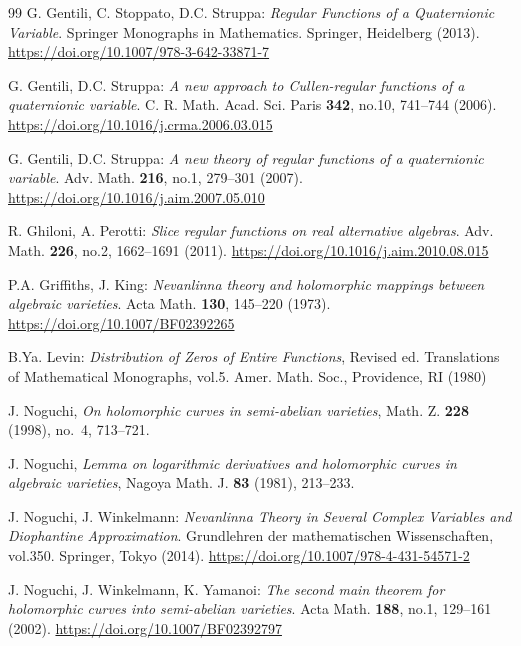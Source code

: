 \documentclass[11pt]{amsart}
\numberwithin{equation}{section}
\theoremstyle{definition}
\theoremstyle{remark}
\begin{document}
\begin{thebibliography}{99}
  G. Gentili, C. Stoppato, D.C. Struppa: \emph{Regular Functions of a Quaternionic Variable}. Springer Monographs in Mathematics. Springer, Heidelberg (2013). \url{https://doi.org/10.1007/978-3-642-33871-7}
  
  G. Gentili, D.C. Struppa: \emph{A new approach to {Cullen}-regular functions of a quaternionic variable}. C. R. Math. Acad. Sci. Paris \textbf{342}, no.10, 741--744 (2006). \url{https://doi.org/10.1016/j.crma.2006.03.015}
  
  G. Gentili, D.C. Struppa: \emph{A new theory of regular functions of a quaternionic variable}. Adv. Math. \textbf{216}, no.1, 279--301 (2007). \url{https://doi.org/10.1016/j.aim.2007.05.010}
  
  R. Ghiloni, A. Perotti: \emph{Slice regular functions on real alternative algebras}. Adv. Math. \textbf{226}, no.2, 1662--1691 (2011). \url{https://doi.org/10.1016/j.aim.2010.08.015}
  
  P.A. Griffiths, J. King: \emph{Nevanlinna theory and holomorphic mappings between algebraic varieties}. Acta Math. \textbf{130}, 145--220 (1973). \url{https://doi.org/10.1007/BF02392265}
  
  B.Ya. Levin: \emph{Distribution of Zeros of Entire Functions}, Revised ed. Translations of Mathematical Monographs, vol.5. Amer. Math. Soc., Providence, RI (1980)
  
  J. Noguchi, \textit{On holomorphic curves in semi-abelian varieties}, Math. Z. \textbf{228} (1998), no.~4, 713--721.

  J. Noguchi, \textit{Lemma on logarithmic derivatives and holomorphic curves in algebraic varieties}, Nagoya Math. J. \textbf{83} (1981), 213--233.

  J. Noguchi, J. Winkelmann: \emph{Nevanlinna Theory in Several Complex Variables and Diophantine Approximation}. Grundlehren der mathematischen Wissenschaften, vol.350. Springer, Tokyo (2014). \url{https://doi.org/10.1007/978-4-431-54571-2}
  
  J. Noguchi, J. Winkelmann, K. Yamanoi: \emph{The second main theorem for holomorphic curves into semi-abelian varieties}. Acta Math. \textbf{188}, no.1, 129--161 (2002). \url{https://doi.org/10.1007/BF02392797}
  

\end{thebibliography}
\end{document}
